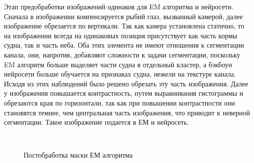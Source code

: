 Этап предобработки изображений одинаков для EM алгоритма и нейросети. Сначала в изображении компенсируется рыбий глаз, вызванный камерой, далее изображение обрезается 
по вертикали. Так как камера установлена статично, то на изображении всегда на одинаковых позиция присутствует как часть кормы судна, так и часть неба. Оба этих 
элемента не имеют отношения к сегментации канала, они, напротив, добавляют сложности к задачи сегментации, поскольку EM алгоритм больше выделяет части судна в 
отдельный кластер, а бэкбоун нейросети больше обучается на признаках судна, нежели на текстуре канала. Исходя из этих наблюдений было решено обрезать эту часть 
изображения. Далее у изображения повышается контрастность, путем выравнивания гистограммы и обрезаются края по горизонтали, так как при повышении контрастности 
они становятся темнее, чем центральная часть изображения, что приводит к неверной сегментации. Такое изображение подается в ЕМ и нейросеть. 

\begin{figure}[htbp]
    \centering
    \\
    \caption{Постобработка маски ЕМ алгоритма}\label{fig:postprocessing}
\end{figure}


